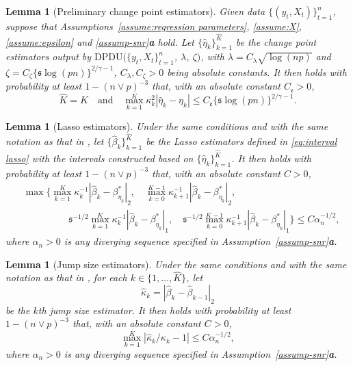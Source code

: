 \documentclass[11pt]{article}
\newcommand{\s}{ { \mathfrak{s}  } }
\theoremstyle{plain}
\newtheorem{lemma}[theorem]{Lemma}
\theoremstyle{definition}
\begin{document}
\begin{lemma}[Preliminary change point estimators] \label{theorem:DUDP}
Given data $\{(y_t, X_t)\}_{t = 1}^n$, suppose that Assumptions~\ref{assume:regression parameters}, \ref{assume:X}, \ref{assume:epsilon} and \ref{assump-snr}\textbf{a} hold.  Let $\{\widehat{\eta}_k\}_{k = 1}^{\widehat{K}}$ be the change point estimators output by $\mathrm{DPDU}(\{y_t, X_t\}_{t = 1}^n$, $\lambda$, $\zeta)$, with $\lambda = C_\lambda \sqrt{\log(np)}$ and $\zeta = C_\zeta\{\s \log(pn)\}^{2/\gamma - 1}$, $C_{\lambda}, C_{\zeta} > 0$ being absolute constants.  It then holds with probability at least $1 - (n \vee p)^{-3}$ that, with an absolute constant $C_{\mathfrak{e}} > 0$,
\[
    \widehat{K} = K \quad \mbox{and} \quad \max_{k = 1}^K \kappa_k^2|\widehat{\eta}_k - \eta_k| \leq C_{\mathfrak{e}} \{\s \log(pn)\}^{2/\gamma - 1}.
\]
\end{lemma}

\begin{lemma}[Lasso estimators] \label{lemmma:refinement_lasso}
Under the same conditions and with the same notation as that in , let $\{\widehat{\beta}_k\}_{k = 1}^{\widehat{K}}$ be the Lasso estimators defined in \eqref{eq:interval lasso} with the intervals constructed based on $\{\widehat{\eta}_k\}_{k = 1}^{\widehat{K}}$.  It then holds with probability at least $1 - (n \vee p)^{-3}$ that, with an absolute constant $C > 0$,
\begin{align*}
    & \max\bigg\{\max_{k = 1}^K \kappa_k^{-1}|\widehat{\beta}_k - \beta_{\eta_k}^*|_2, \quad \max_{k = 0}^{K - 1} \kappa_{k+1}^{-1}|\widehat{\beta}_k - \beta_{\eta_k}^*|_2, \\
    & \hspace{2cm} \s^{-1/2} \max_{k = 1}^K \kappa_k^{-1}|\widehat{\beta}_k - \beta_{\eta_k}^*|_1, \quad \s^{-1/2} \max_{k = 0}^{K-1} \kappa_{k+1}^{-1}|\widehat{\beta}_k - \beta_{\eta_k}^*|_1\bigg\} \leq C \alpha^{-1/2}_{n},
\end{align*}
where $\alpha_n > 0$ is any diverging sequence specified in Assumption~\ref{assump-snr}\textbf{a}.
\end{lemma}

\begin{lemma}[Jump size estimators] \label{lemma:consistency_jump_size_est}
Under the same conditions and with the same notation as that in , for each $k \in \{1, \ldots, \widehat{K}\}$, let 
\begin{equation}\label{eq-jump-size-estimator}
    \widehat{\kappa}_k = |\widehat{\beta}_k - \widehat{\beta}_{k-1}|_2
\end{equation} 
be the $k$th jump size estimator.  It then holds with probability at least $1 - (n \vee p)^{-3}$ that, with an absolute constant $C > 0$,  
\[
    \max_{k = 1}^K |\widehat{\kappa}_k/\kappa_k - 1| \leq C\alpha_n^{-1/2},
\]
where $\alpha_n > 0$ is any diverging sequence specified in Assumption~\ref{assump-snr}\textbf{a}.
\end{lemma}
\end{document}
